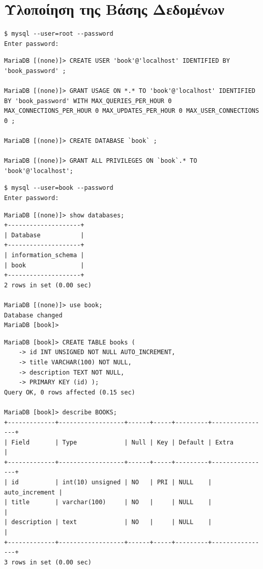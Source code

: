 \documentclass{assignment}
\begin{document}
\section{Υλοποίηση της Βάσης Δεδομένων}



\begin{verbatim}
$ mysql --user=root --password
Enter password: 
\end{verbatim} 


\begin{verbatim}
MariaDB [(none)]> CREATE USER 'book'@'localhost' IDENTIFIED BY 'book_password' ;

MariaDB [(none)]> GRANT USAGE ON *.* TO 'book'@'localhost' IDENTIFIED BY 'book_password' WITH MAX_QUERIES_PER_HOUR 0 MAX_CONNECTIONS_PER_HOUR 0 MAX_UPDATES_PER_HOUR 0 MAX_USER_CONNECTIONS 0 ;

MariaDB [(none)]> CREATE DATABASE `book` ;

MariaDB [(none)]> GRANT ALL PRIVILEGES ON `book`.* TO 'book'@'localhost';

\end{verbatim}

\begin{verbatim}
$ mysql --user=book --password
Enter password: 
\end{verbatim} 


\begin{verbatim}
MariaDB [(none)]> show databases;
+--------------------+
| Database           |
+--------------------+
| information_schema |
| book               |
+--------------------+
2 rows in set (0.00 sec)

MariaDB [(none)]> use book;
Database changed
MariaDB [book]> 

\end{verbatim}

\begin{verbatim}
MariaDB [book]> CREATE TABLE books (
    -> id INT UNSIGNED NOT NULL AUTO_INCREMENT,
    -> title VARCHAR(100) NOT NULL,
    -> description TEXT NOT NULL,
    -> PRIMARY KEY (id) );
Query OK, 0 rows affected (0.15 sec)

MariaDB [book]> describe BOOKS;
+-------------+------------------+------+-----+---------+----------------+
| Field       | Type             | Null | Key | Default | Extra          |
+-------------+------------------+------+-----+---------+----------------+
| id          | int(10) unsigned | NO   | PRI | NULL    | auto_increment |
| title       | varchar(100)     | NO   |     | NULL    |                |
| description | text             | NO   |     | NULL    |                |
+-------------+------------------+------+-----+---------+----------------+
3 rows in set (0.00 sec)


\end{verbatim}
\end{document}
